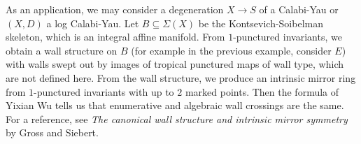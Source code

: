 \documentclass[leqno, openany]{memoir}
\theoremstyle{definition}
\theoremstyle{remark}
\theoremstyle{plain}
\theoremstyle{definition}
\theoremstyle{remark}
\begin{document}
As an application, we may consider a degeneration $X \to S$ of a Calabi-Yau or $(X,D)$ a log Calabi-Yau. Let $B \subseteq \Sigma(X)$ be the Kontsevich-Soibelman skeleton, which is an integral affine manifold. From $1$-punctured invariants, we obtain a wall structure on $B$ (for example in the previous example, consider $E$) with walls swept out by images of tropical punctured maps of wall type, which are not defined here. From the wall structure, we produce an intrinsic mirror ring from $1$-punctured invariants with up to $2$ marked points. Then the formula of Yixian Wu tells us that enumerative and algebraic wall crossings are the same. For a reference, see \textit{The canonical wall structure and intrinsic mirror symmetry} by Gross and Siebert.
\end{document}
